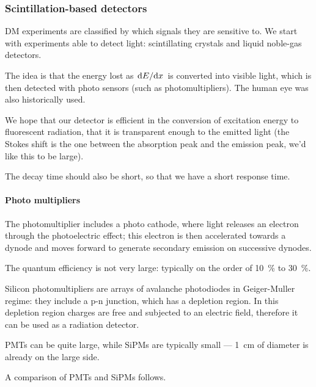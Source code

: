\documentclass[main.tex]{subfiles}
\begin{document}
\subsubsection{Scintillation-based detectors}


DM experiments are classified by which signals they are sensitive to. 
We start with experiments able to detect light: scintillating crystals
and liquid noble-gas detectors. 

The idea is that the energy lost as \(\dv*{E}{x}\) is converted into 
visible light, which is then detected with photo sensors (such as photomultipliers). 
The human eye was also historically used. 


We hope that our detector is efficient in the conversion of excitation energy to 
fluorescent radiation, that it is transparent enough to the emitted light 
(the Stokes shift is the one between the absorption peak and the emission peak,
we'd like this to be large). 

The decay time should also be short, so that we have a short response time. 

\paragraph{Photo multipliers}

The photomultiplier includes a photo cathode, where light releases an electron through 
the photoelectric effect; this electron is then accelerated towards a dynode and moves
forward to generate secondary emission on successive dynodes. 

The quantum efficiency is not very large: typically on the order of \SI{10}{\percent} to \SI{30}{\percent}. 

Silicon photomultipliers are arrays of avalanche photodiodes in Geiger-Muller regime: 
they include a p-n junction, which has a depletion region. 
In this depletion region charges are free and subjected to an electric field, 
therefore it can be used as a radiation detector. 

PMTs can be quite large, while SiPMs are typically small --- \SI{1}{cm} of diameter is 
already on the large side. 

A comparison of PMTs and SiPMs follows. 
\end{document}
